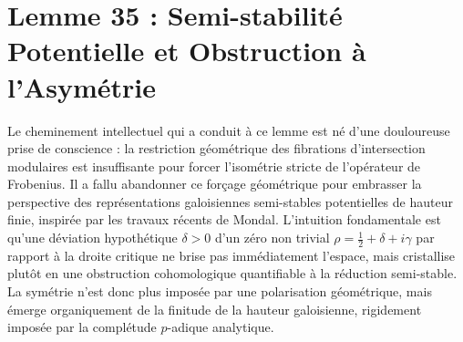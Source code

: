 \documentclass[
]{article}
\begin{document}
\section*{Lemme 35 : Semi-stabilité Potentielle et Obstruction à l'Asymétrie}

Le cheminement intellectuel qui a conduit à ce lemme est né d'une douloureuse prise de conscience : la restriction géométrique des fibrations d'intersection modulaires est insuffisante pour forcer l'isométrie stricte de l'opérateur de Frobenius. Il a fallu abandonner ce forçage géométrique pour embrasser la perspective des représentations galoisiennes semi-stables potentielles de hauteur finie, inspirée par les travaux récents de Mondal. L'intuition fondamentale est qu'une déviation hypothétique $\delta > 0$ d'un zéro non trivial $\rho = \frac{1}{2} + \delta + i\gamma$ par rapport à la droite critique ne brise pas immédiatement l'espace, mais cristallise plutôt en une obstruction cohomologique quantifiable à la réduction semi-stable. La symétrie n'est donc plus imposée par une polarisation géométrique, mais émerge organiquement de la finitude de la hauteur galoisienne, rigidement imposée par la complétude $p$-adique analytique.
\end{document}
